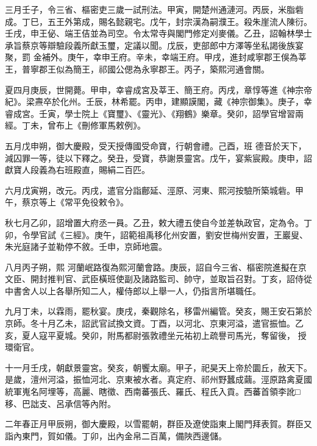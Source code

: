 \begin{pinyinscope}
 三月壬子，令三省、樞密吏三歲一試刑法。甲寅，開楚州通漣河。丙辰，米脂砦成。丁巳，五王外第成，賜名懿親宅。戊午，封宗漢為嗣濮王。殺朱崖流人陳衍。壬戌，申王佖、端王佶並為司空。令太常寺與閣門修定刈麥儀。乙丑，詔翰林學士承旨蔡京等辯驗段義所獻玉璽，定議以聞。戊辰，吏部郎中方澤等坐私謁後族宴聚，罰
 金補外。庚午，幸申王府。辛未，幸端王府。甲戌，進封咸寧郡王俁為莘王，普寧郡王似為簡王，祁國公偲為永寧郡王。丙子，築熙河通會關。



 夏四月庚辰，世開薨。甲申，幸睿成宮及莘王、簡王府。丙戌，章惇等進《神宗帝紀》。梁燾卒於化州。壬辰，林希罷。丙申，建顯謨閣，藏《神宗御集》。庚子，幸睿成宮。壬寅，學士院上《寶璽》、《靈光》、《翔鶴》樂章。癸卯，詔學官增習兩經。丁未，曾布上《刪修軍馬敕例》。



 五月戊申朔，御大慶殿，受天授傳國受命寶，行朝會禮。己酉，班
 德音於天下，減囚罪一等，徒以下釋之。癸丑，受寶，恭謝景靈宮。戊午，宴紫宸殿。庚申，詔獻寶人段義為右班殿直，賜絹二百匹。



 六月戊寅朔，改元。丙戌，遣官分詣鄜延、涇原、河東、熙河按驗所築城砦。甲午，蔡京等上《常平免役敕令》。



 秋七月乙卯，詔增置大府丞一員。乙丑，敕大禮五使自今並差執政官，定為令。丁卯，令學官試《三經》。庚午，詔範祖禹移化州安置，劉安世梅州安置，王巖叟、朱光庭諸子並勒停不敘。壬申，京師地震。



 八月丙子朔，熙
 河蘭岷路復為熙河蘭會路。庚辰，詔自今三省、樞密院進擬在京文臣、開封推判官、武臣橫班使副及諸路監司、帥守，並取旨召對。丁亥，詔侍從中書舍人以上各舉所知二人，權侍郎以上舉一人，仍指言所堪職任。



 九月丁未，以霖雨，罷秋宴。庚戌，秦觀除名，移雷州編管。癸亥，賜王安石第於京師。冬十月乙未，詔武官試換文資。丁酉，以河北、京東河溢，遣官振恤。乙亥，夏人寇平夏城。癸卯，附馬都尉張敦禮坐元祐初上疏譽司馬光，奪留後，
 授環衛官。



 十一月壬戌，朝獻景靈宮。癸亥，朝饗太廟。甲子，祀昊天上帝於圜丘，赦天下。是歲，澶州河溢，振恤河北、京東被水者。真定府、祁州野蠶成繭。涇原路禽夏國統軍嵬名阿埋等，高麗、瞎徵、西南蕃張氏、羅氏、程氏入貢。西蕃首領李訛□移、巴詘支、呂承信等內附。



 二年春正月甲辰朔，御大慶殿，以雪罷朝，群臣及遼使詣東上閣門拜表賀。群臣又詣內東門，賀如儀。丁卯，出內金帛二百萬，備陜西邊儲。




\end{pinyinscope}
